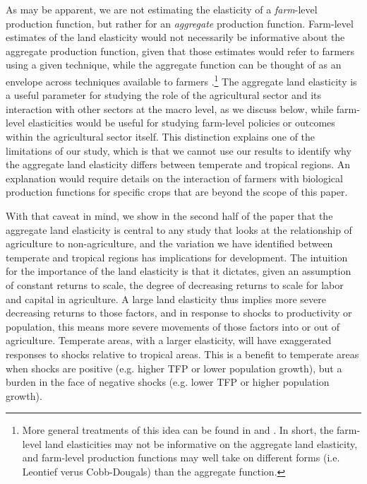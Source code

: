 \documentclass[11pt]{article}
\begin{document}
As may be apparent, we are not estimating the elasticity of a \textit{farm}-level production function, but rather for an \textit{aggregate} production function. Farm-level estimates of the land elasticity would not necessarily be informative about the aggregate production function, given that those estimates would refer to farmers using a given technique, while the aggregate function can be thought of as an envelope across techniques available to farmers \citep{Hayami:1970ly}.\footnote{More general treatments of this idea can be found in \citet{houthakker1955} and \citet{jones2005}. In short, the farm-level land elasticities may not be informative on the aggregate land elasticity, and farm-level production functions may well take on different forms (i.e. Leontief verus Cobb-Dougals) than the aggregate function.} The aggregate land elasticity is a useful parameter for studying the role of the agricultural sector and its interaction with other sectors at the macro level, as we discuss below, while farm-level elasticities would be useful for studying farm-level policies or outcomes within the agricultural sector itself. This distinction explains one of the limitations of our study, which is that we cannot use our results to identify why the aggregate land elasticity differs between temperate and tropical regions. An explanation would require details on the interaction of farmers with biological production functions for specific crops that are beyond the scope of this paper. 

With that caveat in mind, we show in the second half of the paper that the aggregate land elasticity is central to any study that looks at the relationship of agriculture to non-agriculture, and the variation we have identified between temperate and tropical regions has implications for development. The intuition for the importance of the land elasticity is that it dictates, given an assumption of constant returns to scale, the degree of decreasing returns to scale for labor and capital in agriculture. A large land elasticity thus implies more severe decreasing returns to those factors, and in response to shocks to productivity or population, this means more severe movements of those factors into or out of agriculture. Temperate areas, with a larger elasticity, will have exaggerated responses to shocks relative to tropical areas. This is a benefit to temperate areas when shocks are positive (e.g. higher TFP or lower population growth), but a burden in the face of negative shocks (e.g. lower TFP or higher population growth).
\end{document}
